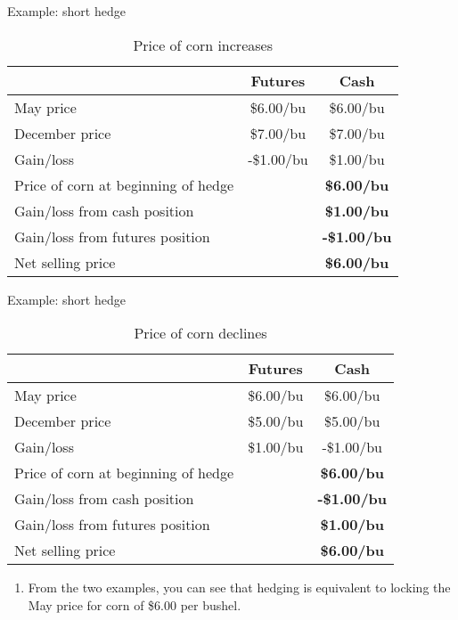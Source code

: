 \documentclass[table,xcolor=pdftex,dvipsnames]{beamer}\usepackage[]{graphicx}\usepackage[]{color}
\begin{document}
\begin{frame}{Example: short hedge}
\begin{table}
\caption{Price of corn increases}
\scriptsize
\begin{tabular}{l c c}
  \toprule
   & Futures & Cash\\
  \midrule
  May price & \$6.00/bu & \$6.00/bu \\
  \addlinespace[0.075in]
  December price & \$7.00/bu & \$7.00/bu \\
  \cmidrule(r){2-3}
  Gain/loss & -\$1.00/bu & \$1.00/bu \\
  \midrule
  Price of corn at beginning of hedge & & \textbf{\$6.00/bu} \\
  \addlinespace[0.075in]
  Gain/loss from cash position & & \textbf{\$1.00/bu}\\
  \addlinespace[0.075in]
  Gain/loss from futures position & & \textbf{-\$1.00/bu}\\
  \cmidrule(r){3-3}
  Net selling price & & \textbf{\$6.00/bu}\\
  \bottomrule
\end{tabular}
\end{table}
\end{frame}


\begin{frame}{Example: short hedge}
\begin{table}
\caption{Price of corn declines}
\scriptsize
\begin{tabular}{l c c}
  \toprule
   & Futures & Cash\\
  \midrule
  May price & \$6.00/bu & \$6.00/bu \\
  \addlinespace[0.075in]
  December price & \$5.00/bu & \$5.00/bu \\
  \cmidrule(r){2-3}
  Gain/loss & \$1.00/bu & -\$1.00/bu \\
  \midrule
  Price of corn at beginning of hedge & & \textbf{\$6.00/bu} \\
  \addlinespace[0.075in]
  Gain/loss from cash position & & \textbf{-\$1.00/bu}\\
  \addlinespace[0.075in]
  Gain/loss from futures position & & \textbf{\$1.00/bu}\\
  \cmidrule(r){3-3}
  Net selling price & & \textbf{\$6.00/bu}\\
  \bottomrule
\end{tabular}
\end{table}
\begin{enumerate}[label=\textbullet]
    \item From the two examples, you can see that hedging is equivalent to locking the May price for corn of \$6.00 per bushel.
\end{enumerate}
\end{frame}
\end{document}
